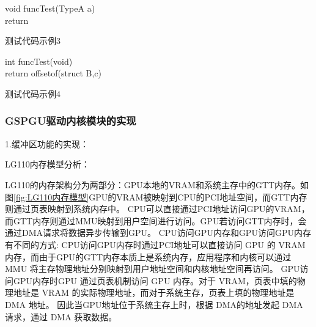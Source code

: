 \begin{minipage}{0.45\textwidth}
  \begin{algorithm}[H]
    \SetAlgoLined
    void funcTest(TypeA a){\\
      return \;
    }
    \caption{测试代码示例3}
    \label{algo:algorithm4}
  \end{algorithm}
\end{minipage}
\hfill
\begin{minipage}{0.45\textwidth}
  \begin{algorithm}[H]
    \SetAlgoLined
    int funcTest(void){\\
      return offsetof(struct B,c) \;
    }
    \caption{测试代码示例4}
    \label{algo:algorithm5}
  \end{algorithm}
\end{minipage}

\subsubsection{GSPGU驱动内核模块的实现}

1.缓冲区功能的实现：

LG110内存模型分析：

LG110的内存架构分为两部分：GPU本地的VRAM和系统主存中的GTT内存。如图\ref{fig:LG110内存模型}GPU的VRAM被映射到CPU的PCI地址空间，而GTT内存则通过页表映射到系统内存中。
CPU可以直接通过PCI地址访问GPU的VRAM，而GTT内存则通过MMU映射到用户空间进行访问。GPU若访问GTT内存时，会通过DMA请求将数据异步传输到GPU。
CPU访问GPU内存和GPU访问GPU内存有不同的方式:
CPU访问GPU内存时通过PCI地址可以直接访问 GPU 的 VRAM 内存，而由于GPU的GTT内存本质上是系统内存，应用程序和内核可以通过 MMU 将主存物理地址分别映射到用户地址空间和内核地址空间再访问。
GPU访问GPU内存时GPU 通过页表机制访问 GPU 内存。对于 VRAM，页表中填的物理地址是 VRAM 的实际物理地址，而对于系统主存，页表上填的物理地址是 DMA 地址。
因此当GPU地址位于系统主存上时，根据 DMA的地址发起 DMA 请求，通过 DMA 获取数据。

